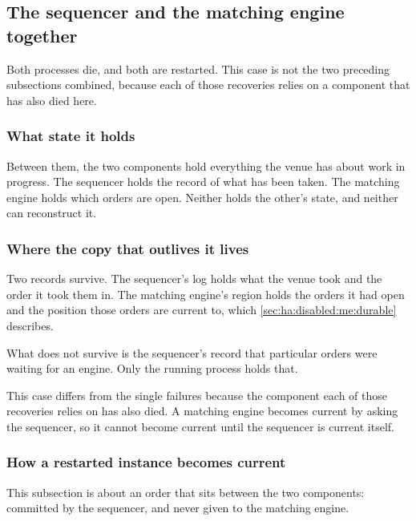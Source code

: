 \subsection{The sequencer and the matching engine together}
\label{sec:ha:disabled:seq_and_me}

Both processes die, and both are restarted. This case is not the two preceding
subsections combined, because each of those recoveries relies on a component that
has also died here.

\subsubsection{What state it holds}
\label{sec:ha:disabled:seq_and_me:state}

Between them, the two components hold everything the venue has about work in
progress. The sequencer holds the record of what has been taken. The matching
engine holds which orders are open. Neither holds the other's state, and neither
can reconstruct it.

\subsubsection{Where the copy that outlives it lives}
\label{sec:ha:disabled:seq_and_me:durable}

Two records survive. The sequencer's log holds what the venue took and the order
it took them in. The matching engine's region holds the orders it had open and
the position those orders are current to, which
\cref{sec:ha:disabled:me:durable} describes.

What does not survive is the sequencer's record that particular orders were
waiting for an engine. Only the running process holds that.

This case differs from the single failures because the component each of those
recoveries relies on has also died. A matching engine becomes current by asking
the sequencer, so it cannot become current until the sequencer is current
itself.

\subsubsection{How a restarted instance becomes current}
\label{sec:ha:disabled:seq_and_me:recovery}

This subsection is about an order that sits between the two components:
committed by the sequencer, and never given to the matching engine.

